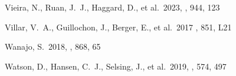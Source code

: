 \documentclass[twocolumn,twocolappendix]{aastex63}
\begin{document}
\begin{thebibliography}{}
 Vieira, N., Ruan, J.~J., Haggard, D., et al.\ 2023, \apj, 944, 123

Villar, V.~A., Guillochon, J., Berger, E., et al.\ 2017 \aj, 851, L21












 Wanajo, S.\ 2018, \apj, 868, 65






 Watson, D., Hansen, C.~J., Selsing, J., et al.\ 2019, \nat, 574, 497


















\end{thebibliography}
\end{document}
